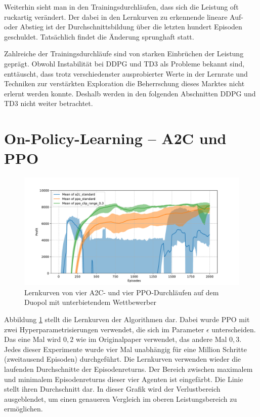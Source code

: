 Weiterhin sieht man in den Trainingsdurchläufen, dass sich die Leistung oft ruckartig verändert.
Der dabei in den Lernkurven zu erkennende lineare Auf- oder Abstieg ist der Durchschnittsbildung über die letzten hundert Episoden geschuldet.
Tatsächlich findet die Änderung sprunghaft statt.

Zahlreiche der Trainingsdurchläufe sind von starken Einbrüchen der Leistung geprägt.
Obwohl Instabilität bei DDPG und TD3 als Probleme bekannt sind, enttäuscht, dass trotz verschiedenster ausprobierter Werte in der Lernrate und Techniken zur verstärkten Exploration die Beherrschung dieses Marktes nicht erlernt werden konnte.
Deshalb werden in den folgenden Abschnitten DDPG und TD3 nicht weiter betrachtet.

\section{On-Policy-Learning -- A2C und PPO}
\label{section:main_ppo}
\begin{figure}[htb]
	\centering
	\includegraphics[width=\textwidth]{main/a2c_vs_ppo.pdf}
	\caption{Lernkurven von vier A2C- und vier PPO-Durchläufen auf dem Duopol mit unterbietendem Wettbewerber}
	\label{graphic:OnPolicyLearningCurves}
\end{figure}

Abbildung \ref{graphic:OnPolicyLearningCurves} stellt die Lernkurven der Algorithmen dar.
Dabei wurde PPO mit zwei Hyperparametrisierungen verwendet, die sich im Parameter $\epsilon$ unterscheiden.
Das eine Mal wird $0{,}2$ wie im Originalpaper verwendet, das andere Mal $0{,}3$.
Jedes dieser Experimente wurde vier Mal unabhängig für eine Million Schritte (zweitausend Episoden) durchgeführt.
Die Lernkurven verwenden wieder die laufenden Durchschnitte der Episodenreturns.
Der Bereich zwischen maximalem und minimalem Episodenreturns dieser vier Agenten ist eingefärbt.
Die Linie stellt ihren Durchschnitt dar.
In dieser Grafik wird der Verlustbereich ausgeblendet, um einen genaueren Vergleich im oberen Leistungsbereich zu ermöglichen.

